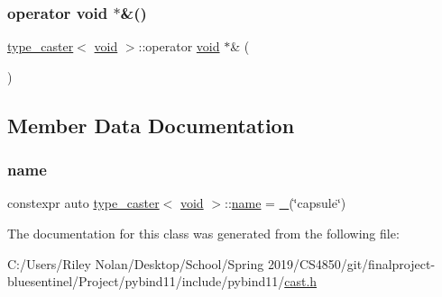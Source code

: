 \mbox{\label{classtype__caster_3_01void_01_4_adc394a95bcc81e382ac81ad44039a072}} 
\subsubsection{\texorpdfstring{operator void $\ast$\&()}{operator void *\&()}}
{\footnotesize\ttfamily \mbox{\hyperlink{classtype__caster}{type\+\_\+caster}}$<$ \mbox{\hyperlink{_s_d_l__opengles2__gl2ext_8h_ae5d8fa23ad07c48bb609509eae494c95}{void}} $>$\+::operator \mbox{\hyperlink{_s_d_l__opengles2__gl2ext_8h_ae5d8fa23ad07c48bb609509eae494c95}{void}} $\ast$\& (\begin{DoxyParamCaption}{ }\end{DoxyParamCaption})\hspace{0.3cm}{\ttfamily [inline]}}



\subsection{Member Data Documentation}
\mbox{\label{classtype__caster_3_01void_01_4_ac118efe07d462b63f42890e5e0bd0444}} 
\subsubsection{\texorpdfstring{name}{name}}
{\footnotesize\ttfamily constexpr auto \mbox{\hyperlink{classtype__caster}{type\+\_\+caster}}$<$ \mbox{\hyperlink{_s_d_l__opengles2__gl2ext_8h_ae5d8fa23ad07c48bb609509eae494c95}{void}} $>$\+::\mbox{\hyperlink{structname}{name}} = \mbox{\hyperlink{descr_8h_af114703e20c6527e87163eb2798f74b8}{\+\_\+}}(\char`\"{}capsule\char`\"{})\hspace{0.3cm}{\ttfamily [static]}}



The documentation for this class was generated from the following file\+:\begin{DoxyCompactItemize}
\item 
C\+:/\+Users/\+Riley Nolan/\+Desktop/\+School/\+Spring 2019/\+C\+S4850/git/finalproject-\/bluesentinel/\+Project/pybind11/include/pybind11/\mbox{\hyperlink{cast_8h}{cast.\+h}}\end{DoxyCompactItemize}
